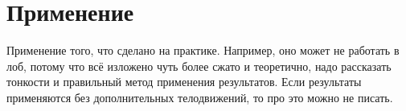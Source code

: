 
\section{Применение}

Применение того, что сделано на практике. Например, оно может не работать в лоб, потому что всё изложено чуть более сжато и теоретично, надо рассказать тонкости и правильный метод применения результатов. Если результаты применяются без до\-полнительных телодвижений, то про это можно не писать.
